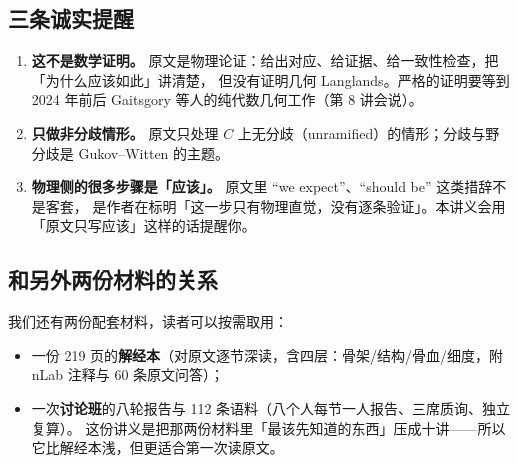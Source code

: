 \subsection*{三条诚实提醒}

\begin{enumerate}
\item \textbf{这不是数学证明。} 原文是物理论证：给出对应、给证据、给一致性检查，把「为什么应该如此」讲清楚，
      但没有证明几何 Langlands。严格的证明要等到 2024 年前后 Gaitsgory 等人的纯代数几何工作（第 8 讲会说）。
\item \textbf{只做非分歧情形。} 原文只处理 $C$ 上无分歧（unramified）的情形；分歧与野分歧是 Gukov--Witten \cite{gw06} 的主题。
\item \textbf{物理侧的很多步骤是「应该」。} 原文里 ``we expect''、``should be'' 这类措辞不是客套，
      是作者在标明「这一步只有物理直觉，没有逐条验证」。本讲义会用「原文只写应该」这样的话提醒你。
\end{enumerate}

\subsection*{和另外两份材料的关系}

我们还有两份配套材料，读者可以按需取用：
\begin{itemize}
\item 一份 219 页的\textbf{解经本}（对原文逐节深读，含四层：骨架/结构/骨血/细度，附 nLab 注释与 60 条原文问答）；
\item 一次\textbf{讨论班}的八轮报告与 112 条语料（八个人每节一人报告、三席质询、独立复算）。
这份讲义是把那两份材料里「最该先知道的东西」压成十讲——所以它比解经本浅，但更适合第一次读原文。
\end{itemize}
